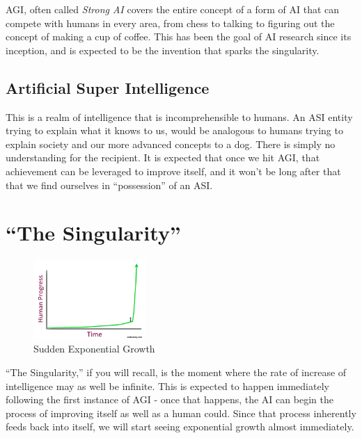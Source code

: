 \documentclass[12pt]{article} %
\begin{document}
AGI, often called \textit{Strong AI} covers the entire concept of a form of AI that can compete with humans in every area, from chess to talking to figuring out the concept of making a cup of coffee. This has been the goal of AI research since its inception, and is expected to be the invention that sparks the singularity.


\subsection{Artificial Super Intelligence} %

This is a realm of intelligence that is incomprehensible to humans. An ASI entity trying to explain what it knows to us, would be analogous to humans trying to explain society and our more advanced concepts to a dog. There is simply no understanding for the recipient. It is expected that once we hit AGI, that achievement can be leveraged to improve itself, and it won't be long after that that we find ourselves in ``possession'' of an ASI.


\section{``The Singularity''}

\begin{figure} %
  \begin{center}
    \includegraphics[width=0.38\textwidth]{ontheedge}
  \end{center}
  \caption{Sudden Exponential Growth}
\end{figure}

``The Singularity,'' if you will recall, is the moment where the rate of increase of intelligence may as well be infinite. This is expected to happen immediately following the first instance of AGI - once that happens, the AI can begin the process of improving itself as well as a human could. Since that process inherently feeds back into itself, we will start seeing exponential growth almost immediately.
\end{document}
